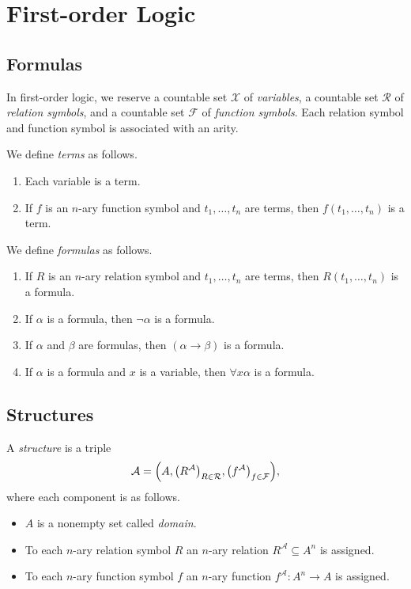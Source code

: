 \chapter{First-order Logic}
\section{Formulas}
In first-order logic, we reserve a countable set $\mathcal{X}$ of
\emph{variables}, a countable set $\mathcal{R}$ of \emph{relation symbols}, and
a countable set $\mathcal{F}$ of \emph{function symbols}.
Each relation symbol and function symbol is associated with an arity.

\begin{definition}
  We define \emph{terms} as follows.
  \begin{enumerate}[1.]
    \item Each variable is a term.
    \item If $f$ is an $n$-ary function symbol and $t_1, \dots, t_n$ are terms,
    then $f(t_1, \dots, t_n)$ is a term.
  \end{enumerate}
\end{definition}

\begin{definition}
  We define \emph{formulas} as follows.
  \begin{enumerate}[1.]
    \item If $R$ is an $n$-ary relation symbol and $t_1, \dots, t_n$ are
    terms, then $R(t_1, \dots, t_n)$ is a formula.
    \item If $\alpha$ is a formula, then $\neg\alpha$ is a formula.
    \item If $\alpha$ and $\beta$ are formulas, then $(\alpha \to \beta)$ is a
    formula.
    \item If $\alpha$ is a formula and $x$ is a variable, then
    $\forall x \alpha$ is a formula.
  \end{enumerate}
\end{definition}

\section{Structures}
\begin{definition}
  A \emph{structure} is a triple
  \begin{equation*}
    \mathcal{A} =
    \Bigl(
      A,
      \bigl(R^\mathcal{A}\bigr)_{R \in \mathcal{R}},
      \bigl(f^\mathcal{A}\bigr)_{f \in \mathcal{F}}
    \Bigr),
  \end{equation*}
  where each component is as follows.
  \begin{itemize}
    \item $A$ is a nonempty set called \emph{domain}.
    \item To each $n$-ary relation symbol $R$ an $n$-ary relation
    $R^\mathcal{A} \subseteq A^n$ is assigned.
    \item To each $n$-ary function symbol $f$ an $n$-ary function
    $f^\mathcal{A}: A^n \to A$ is assigned.
  \end{itemize}
\end{definition}
